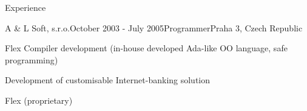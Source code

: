 \documentclass{resume} %
\begin{document}
\begin{rSection}{Experience}

\begin{rSubsection}{A \& L Soft, s.r.o.}{October 2003 - July 2005}{Programmer}{Praha 3, Czech Republic}
\item Flex Compiler development (in-house developed Ada-like OO language, safe programming)
\item Development of customisable Internet-banking solution
\item Flex (proprietary)
\end{rSubsection}

\end{rSection}

\end{document}
